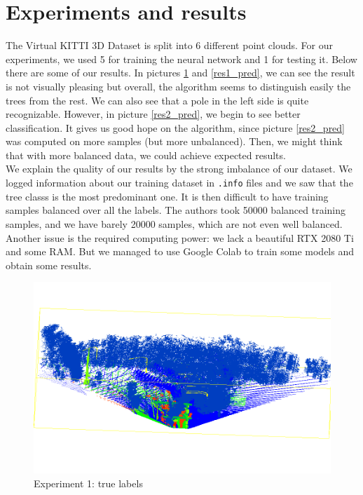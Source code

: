 \section{Experiments and results}
\label{sec:results}

The Virtual KITTI 3D Dataset is split into 6 different point clouds. For our experiments, we used 5 for training the neural network and 1 for testing it. Below there are some of our results. In pictures \ref{res_true} and \ref{res1_pred}, we can see the result is not visually pleasing but overall, the algorithm seems to distinguish easily the trees from the rest. We can also see that a pole in the left side is quite recognizable. However, in picture \ref{res2_pred}, we begin to see better classification. It gives us good hope on the algorithm, since picture \ref{res2_pred} was computed on more samples (but more unbalanced). Then, we might think that with more balanced data, we could achieve expected results.\\

We explain the quality of our results by the strong imbalance of our dataset. We logged information about our training dataset in \verb|.info| files and we saw that the tree classs is the most predominant one. It is then difficult to have training samples balanced over all the labels. The authors took 50000 balanced training samples, and we have barely 20000 samples, which are not even well balanced. Another issue is the required computing power: we lack a beautiful RTX 2080 Ti and some RAM. But we managed to use Google Colab to train some models and obtain some results.

\begin{figure}[H]
    \centering
	\includegraphics[scale=0.27]{sources/res_true.png}
	\caption{Experiment 1: true labels}
	\label{res_true}
\end{figure}

